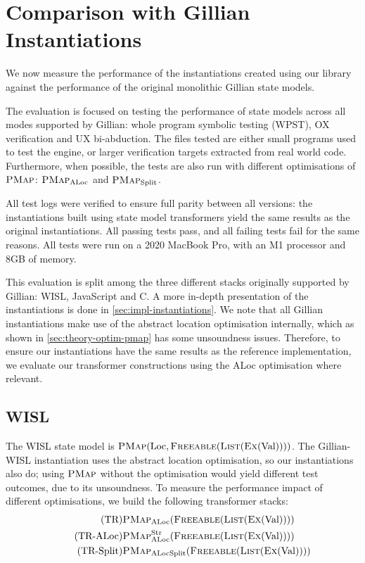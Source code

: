 \section{Comparison with Gillian Instantiations} \label{sec:comparison-gillian}

We now measure the performance of the instantiations created using our library against the performance of the original monolithic Gillian state models.

The evaluation is focused on testing the performance of state models across all modes supported by Gillian: whole program symbolic testing (WPST), OX verification and UX bi-abduction. The files tested are either small programs used to test the engine, or larger verification targets extracted from real world code. Furthermore, when possible, the tests are also run with different optimisations of $\textsc{PMap}$: $\textsc{PMap}_{\text{ALoc}}$ and $\textsc{PMap}_{\text{Split}}$.

All test logs were verified to ensure full parity between all versions: the instantiations built using state model transformers yield the same results as the original instantiations. All passing tests pass, and all failing tests fail for the same reasons. All tests were run on a 2020 MacBook Pro, with an M1 processor and 8GB of memory.

This evaluation is split among the three different stacks originally supported by Gillian: WISL, JavaScript and C. A more in-depth presentation of the instantiations is done in \cref{sec:impl-instantiations}. We note that all Gillian instantiations make use of the abstract location optimisation internally, which as shown in \cref{sec:theory-optim-pmap} has some unsoundness issues. Therefore, to ensure our instantiations have the same results as the reference implementation, we evaluate our transformer constructions using the ALoc optimisation where relevant.

\subsection{WISL}

The WISL state model is $\textsc{PMap}(\text{Loc}, \textsc{Freeable}(\textsc{List}(\textsc{Ex}(\text{Val}))))$. The Gillian-WISL instantiation uses the abstract location optimisation, so our instantiations also do; using $\textsc{PMap}$ without the optimisation would yield different test outcomes, due to its unsoundness.  To measure the performance impact of different optimisations, we build the following transformer stacks: \begin{align}
\tag{TR}       & \textsc{PMap}_{\text{ALoc}}(\textsc{Freeable}(\textsc{List}(\textsc{Ex}(\text{Val})))) \\
\tag{TR-ALoc}  & \textsc{PMap}_{\text{ALoc}}^{\text{Str}}(\textsc{Freeable}(\textsc{List}(\textsc{Ex}(\text{Val})))) \\
\tag{TR-Split} & \textsc{PMap}_{\text{ALocSplit}}(\textsc{Freeable}(\textsc{List}(\textsc{Ex}(\text{Val}))))
\end{align}

